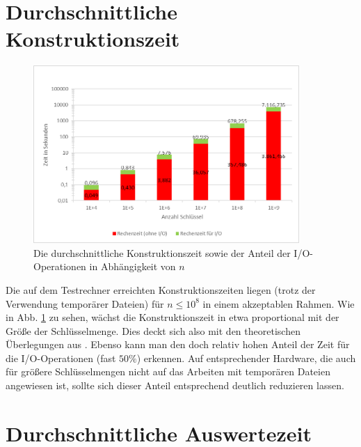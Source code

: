 \documentclass[a4paper,12pt,twoside]{report}
\begin{document}
\section{Durchschnittliche Konstruktionszeit}
\label{sec:konstruktionszeit}

\begin{figure}[tbhp]
\centering
\includegraphics[width=0.9\textwidth]{diagrams/Konstruktionszeit.png} 
\caption{Die durchschnittliche Konstruktionszeit sowie der Anteil der I/O-Operationen in Abhängigkeit von $n$}
\label{img:Konstruktionszeit}
\end{figure}
Die auf dem Testrechner erreichten Konstruktionszeiten liegen (trotz der Verwendung temporärer Dateien) für $n\leq 10^8$ in einem akzeptablen Rahmen.
Wie in Abb. \ref{img:Konstruktionszeit} zu sehen, wächst die Konstruktionszeit in etwa proportional mit der Größe der Schlüsselmenge.
Dies deckt sich also mit den theoretischen Überlegungen aus \cite{Botelho2013108}.
Ebenso kann man den doch relativ hohen Anteil der Zeit für die I/O-Operationen (fast $50\%$) erkennen.
Auf entsprechender Hardware, die auch für größere Schlüsselmengen nicht auf das Arbeiten mit temporären Dateien angewiesen ist, sollte sich dieser Anteil entsprechend deutlich reduzieren lassen.


\section{Durchschnittliche Auswertezeit}
\label{sec:auswertezeit}
\end{document}
